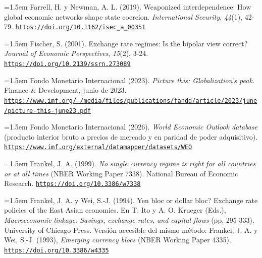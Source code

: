 \documentclass[10pt,a4paper]{article}
\begin{document}
{\sloppy\noindent\hangindent=1.5em Farrell, H. y Newman, A. L. (2019). Weaponized interdependence: How global economic networks shape state coercion. \textit{International Security}, \textit{44}(1), 42-79. \href{https://doi.org/10.1162/isec_a_00351}{\nolinkurl{https://doi.org/10.1162/isec_a_00351}}\par}

{\sloppy\noindent\hangindent=1.5em Fischer, S. (2001). Exchange rate regimes: Is the bipolar view correct? \textit{Journal of Economic Perspectives}, \textit{15}(2), 3-24. \href{https://doi.org/10.2139/ssrn.273089}{\nolinkurl{https://doi.org/10.2139/ssrn.273089}}\par}

{\sloppy\noindent\hangindent=1.5em Fondo Monetario Internacional (2023). \textit{Picture this: Globalization's peak}. Finance \& Development, junio de 2023. \href{https://www.imf.org/-/media/files/publications/fandd/article/2023/june/picture-this-june23.pdf}{\nolinkurl{https://www.imf.org/-/media/files/publications/fandd/article/2023/june/picture-this-june23.pdf}}\par}

{\sloppy\noindent\hangindent=1.5em Fondo Monetario Internacional (2026). \textit{World Economic Outlook database} (producto interior bruto a precios de mercado y en paridad de poder adquisitivo). \href{https://www.imf.org/external/datamapper/datasets/WEO}{\nolinkurl{https://www.imf.org/external/datamapper/datasets/WEO}}\par}

{\sloppy\noindent\hangindent=1.5em Frankel, J. A. (1999). \textit{No single currency regime is right for all countries or at all times} (NBER Working Paper 7338). National Bureau of Economic Research. \href{https://doi.org/10.3386/w7338}{\nolinkurl{https://doi.org/10.3386/w7338}}\par}

{\sloppy\noindent\hangindent=1.5em Frankel, J. A. y Wei, S.-J. (1994). Yen bloc or dollar bloc? Exchange rate policies of the East Asian economies. En T. Ito y A. O. Krueger (Eds.), \textit{Macroeconomic linkage: Savings, exchange rates, and capital flows} (pp. 295-333). University of Chicago Press. Versión accesible del mismo método: Frankel, J. A. y Wei, S.-J. (1993), \textit{Emerging currency blocs} (NBER Working Paper 4335). \href{https://doi.org/10.3386/w4335}{\nolinkurl{https://doi.org/10.3386/w4335}}\par}
\end{document}
